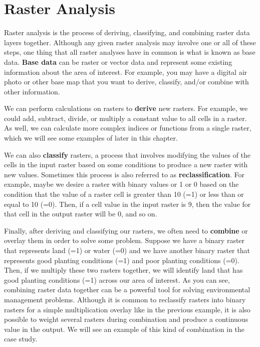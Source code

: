 \documentclass[
]{book}
\begin{document}
\hypertarget{raster-analysis}{%
\section{Raster Analysis}\label{raster-analysis}}

Raster analysis is the process of deriving, classifying, and combining raster data layers together. Although any given raster analysis may involve one or all of these steps, one thing that all raster analyses have in common is what is known as base data. \textbf{Base data} can be raster or vector data and represent some existing information about the area of interest. For example, you may have a digital air photo or other base map that you want to derive, classify, and/or combine with other information.

We can perform calculations on rasters to \textbf{derive} new rasters. For example, we could add, subtract, divide, or multiply a constant value to all cells in a raster. As well, we can calculate more complex indices or functions from a single raster, which we will see some examples of later in this chapter.

We can also \textbf{classify} rasters, a process that involves modifying the values of the cells in the input raster based on some conditions to produce a new raster with new values. Sometimes this process is also referred to as \textbf{reclassification}. For example, maybe we desire a raster with binary values or 1 or 0 based on the condition that the value of a raster cell is greater than 10 (=1) or less than or equal to 10 (=0). Then, if a cell value in the input raster is 9, then the value for that cell in the output raster will be 0, and so on.

Finally, after deriving and classifying our rasters, we often need to \textbf{combine} or overlay them in order to solve some problem. Suppose we have a binary raster that represents land (=1) or water (=0) and we have another binary raster that represents good planting conditions (=1) and poor planting conditions (=0). Then, if we multiply these two rasters together, we will identify land that has good planting conditions (=1) across our area of interest. As you can see, combining raster data together can be a powerful tool for solving environmental management problems. Although it is common to reclassify rasters into binary rasters for a simple multiplication overlay like in the previous example, it is also possible to weight several rasters during combination and produce a continuous value in the output. We will see an example of this kind of combination in the case study.
\end{document}
